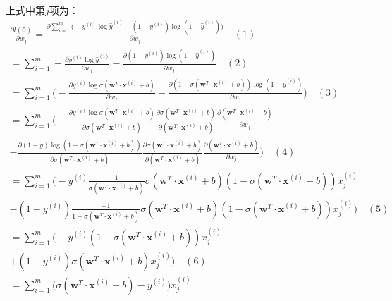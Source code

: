 \documentclass[UTF8]{article}
\begin{document}
上式中第$j$项为：
\begin{equation}
\begin{aligned}
\frac{ \partial{l(\boldsymbol{\theta})} } { \partial{w_{j}} } = \frac{ \partial{ \sum_{i=1}^{m} \Big( -y^{(i)} \log \hat{y}^{(i)} - (1-y^{(i)})\log(1 - \hat{y}^{(i)}) \Big) } } { \partial{w_{j}} } \quad (1) \\
=\sum_{i=1}^{m} -\frac{\partial{y^{(i)} \log \hat{y}^{(i)}}}{ \partial{w_{j}}} - \frac{\partial{ (1-y^{(i)})\log(1 - \hat{y}^{(i)}) }}{ \partial{w_{j}}} \quad (2) \\
= \sum_{i=1}^{m} \bigg(-\frac{\partial{y^{(i)} \log \sigma(\boldsymbol{w}^{T} \cdot \boldsymbol{x}^{(i)} + b) }}{ \partial{w_{j}}}- \frac{\partial{ (1- \sigma(\boldsymbol{w}^{T} \cdot \boldsymbol{x}^{(i)} + b))\log(1 - \hat{y}^{(i)}) }}{ \partial{w_{j}}} \bigg) \quad (3) \\
= \sum_{i=1}^{m} \bigg(-\frac{\partial{y^{(i)} \log \sigma(\boldsymbol{w}^{T} \cdot \boldsymbol{x}^{(i)} + b) }}{\partial{\sigma(\boldsymbol{w}^{T} \cdot \boldsymbol{x}^{(i)} + b)}} \frac{\partial{\sigma(\boldsymbol{w}^{T} \cdot \boldsymbol{x}^{(i)} + b)}}{\partial{(\boldsymbol{w}^{T} \cdot \boldsymbol{x}^{(i)} + b)}}  \frac{\partial{(\boldsymbol{w}^{T} \cdot \boldsymbol{x}^{(i)} + b)}}{ \partial{w_{j}}} \\
- \frac{\partial{ (1- y)\log(1 - \sigma(\boldsymbol{w}^{T} \cdot \boldsymbol{x}^{(i)} + b)) }}{\partial{\sigma(\boldsymbol{w}^{T} \cdot \boldsymbol{x}^{(i)} + b)}} \frac{\partial{\sigma(\boldsymbol{w}^{T} \cdot \boldsymbol{x}^{(i)} + b)}}{\partial{(\boldsymbol{w}^{T} \cdot \boldsymbol{x}^{(i)} + b)}}  \frac{\partial{(\boldsymbol{w}^{T} \cdot \boldsymbol{x}^{(i)} + b)}}{ \partial{w_{j}}} \bigg) \quad (4) \\
= \sum_{i=1}^{m} \Big( -y^{(i)}\frac{1}{\sigma(\boldsymbol{w}^{T} \cdot \boldsymbol{x}^{(i)} + b)}\sigma(\boldsymbol{w}^{T} \cdot \boldsymbol{x}^{(i)} + b)(1-\sigma(\boldsymbol{w}^{T} \cdot \boldsymbol{x}^{(i)} + b))x_{j}^{(i)} \\
- (1-y^{(i)})\frac{-1}{1 - \sigma(\boldsymbol{w}^{T} \cdot \boldsymbol{x}^{(i)} + b)}\sigma(\boldsymbol{w}^{T} \cdot \boldsymbol{x}^{(i)} + b)(1-\sigma(\boldsymbol{w}^{T} \cdot \boldsymbol{x}^{(i)} + b))x_{j}^{(i)} \Big) \quad (5)\\
= \sum_{i=1}^{m} \Big( -y^{(i)}(1-\sigma(\boldsymbol{w}^{T} \cdot \boldsymbol{x}^{(i)} + b))x_{j}^{(i)} \\
+(1-y^{(i)})\sigma(\boldsymbol{w}^{T} \cdot \boldsymbol{x}^{(i)} + b)x_{j}^{(i)}  \Big) \quad (6) \\
= \sum_{i=1}^{m} \Big( \sigma(\boldsymbol{w}^{T} \cdot \boldsymbol{x}^{(i)} + b) - y^{(i)} \Big)x_{j}^{(i)}
\end{aligned}
\label{lcrn-nll-vs-wj-gradient}
\end{equation}
\end{document}

